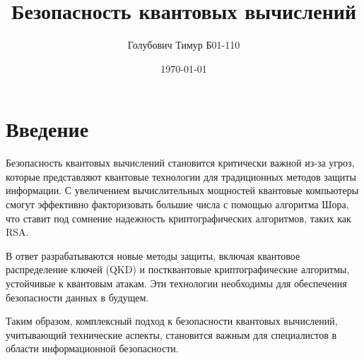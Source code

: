 \documentclass[12pt]{article}
\title{Безопасность квантовых вычислений \\ \large  }
\author{Голубович Тимур Б01-110}
\date{\today}
\begin{document}
\maketitle

\tableofcontents
\newpage

\section{Введение}

Безопасность квантовых вычислений становится критически важной из-за угроз, которые представляют квантовые технологии для традиционных методов защиты информации. С увеличением вычислительных мощностей квантовые компьютеры смогут эффективно факторизовать большие числа с помощью алгоритма Шора, что ставит под сомнение надежность криптографических алгоритмов, таких как RSA.

В ответ разрабатываются новые методы защиты, включая квантовое распределение ключей (QKD) и постквантовые криптографические алгоритмы, устойчивые к квантовым атакам. Эти технологии необходимы для обеспечения безопасности данных в будущем.

Таким образом, комплексный подход к безопасности квантовых вычислений, учитывающий технические аспекты, становится важным для специалистов в области информационной безопасности.

\vspace{1cm} %
\end{document}
